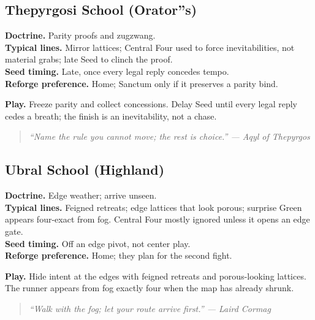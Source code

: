 \documentclass[11pt]{article}
\providecommand{\playdesc}[1]{\par\smallskip\noindent\small\textbf{Play.} #1\par}
\begin{document}
\subsection*{Thepyrgosi School (Orator''s)}
\textbf{Doctrine.} Parity proofs and zugzwang.\\
\textbf{Typical lines.} Mirror lattices; Central Four used to force inevitabilities, not material grabs; late Seed to clinch the proof.\\
\textbf{Seed timing.} Late, once every legal reply concedes tempo.\\
\textbf{Reforge preference.} Home; Sanctum only if it preserves a parity bind.
\playdesc{Freeze parity and collect concessions. Delay Seed until every legal reply cedes a breath; the finish is an inevitability, not a chase.}
\begin{quote}\small\itshape
``Name the rule you cannot move; the rest is choice.'' --- Aqyl of Thepyrgos
\end{quote}

\subsection*{Ubral School (Highland)}
\textbf{Doctrine.} Edge weather; arrive unseen.\\
\textbf{Typical lines.} Feigned retreats; edge lattices that look porous; surprise Green appears four-exact from fog. Central Four mostly ignored unless it opens an edge gate.\\
\textbf{Seed timing.} Off an edge pivot, not center play.\\
\textbf{Reforge preference.} Home; they plan for the second fight.
\playdesc{Hide intent at the edges with feigned retreats and porous-looking lattices. The runner appears from fog exactly four when the map has already shrunk.}
\begin{quote}\small\itshape
``Walk with the fog; let your route arrive first.'' --- Laird Cormag
\end{quote}

\end{document}
